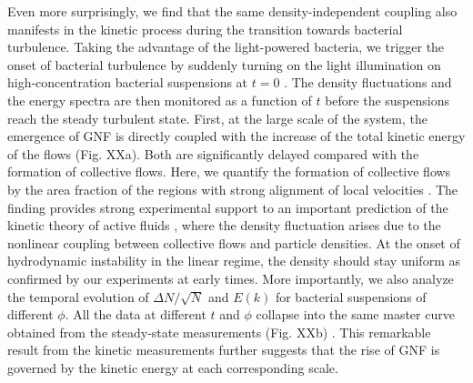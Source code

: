 \documentclass[twocolumn,aps,prl,amsmath,amssymb,longbibliography]{revtex4-2}
\begin{document}
Even more surprisingly, %
we find that the same density-independent coupling also manifests in the kinetic process during the transition towards bacterial turbulence. Taking the advantage of the light-powered bacteria, we trigger the onset of bacterial turbulence by suddenly turning on the light illumination on high-concentration bacterial suspensions at $t=0$ \cite{Peng2020}. The density fluctuations and the energy spectra are then monitored as a function of $t$ before the suspensions reach the steady turbulent state. First, at the large scale of the system, the emergence of GNF is directly coupled with the increase of the total kinetic energy of the flows (Fig. XXa). Both are significantly delayed compared with the formation of collective flows. Here, we quantify the formation of collective flows by the area fraction of the regions with strong alignment of local velocities \cite{Liu2020,Peng2020}. The finding provides strong experimental support to an important prediction of the kinetic theory of active fluids \cite{Saintillan2008a,Saintillan2008b}, where the density fluctuation arises due to the nonlinear coupling between collective flows and particle densities. At the onset of hydrodynamic instability in the linear regime, the density should stay uniform as confirmed by our experiments at early times.
More importantly, we also analyze the temporal evolution of $\Delta N/\sqrt N$ and $E(k)$ for bacterial suspensions of different $\phi$. All the data at different $t$ and $\phi$ collapse into the same master curve obtained from the steady-state measurements (Fig. XXb) \cite{Liu2020}.
This remarkable result from the kinetic measurements further suggests that the rise of GNF is governed by the kinetic energy at each corresponding scale.
\end{document}
